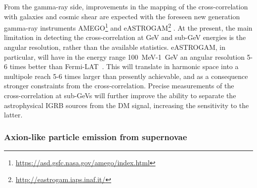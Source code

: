 

From the gamma-ray side, improvements in the mapping of the cross-correlation with galaxies and cosmic shear are 
expected with the foreseen new generation gamma-ray instruments AMEGO\footnote{\url{https://asd.gsfc.nasa.gov/amego/index.html}} and eASTROGAM\footnote{\url{http://eastrogam.iaps.inaf.it/}} \citep{1711.01265}.
At the present, the main limitation in detecting the cross-correlation at GeV and sub-GeV energies is the angular
resolution, rather than the available statistics.  eASTROGAM, in particular, will have in the energy range \mbox{100 MeV-1 GeV}
an angular resolution 5-6 times better than Fermi-LAT~\citep{1711.01265}. This will translate in harmonic space into a multipole reach 5-6 times larger than presently achievable, and as a consequence stronger constraints from the cross-correlation.
Precise measurements of the cross-correlation at sub-GeVs will further improve the ability to separate the astrophysical IGRB sources from the DM signal, increasing the sensitivity to the latter. 













\subsubsection{Axion-like particle emission from supernovae }

